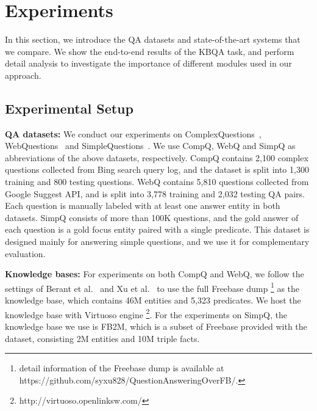 \section{Experiments}
\label{sec:exp}

In this section, we introduce the QA datasets and state-of-the-art systems
that we compare.
We show the end-to-end results of the KBQA task,
and perform detail analysis to investigate the importance of different modules
used in our approach.



\subsection{Experimental Setup}

\textbf{QA datasets:}
We conduct our experiments on ComplexQuestions~\cite{bao2016constraint},
WebQuestions~\cite{berant2013semantic} and SimpleQuestions~\cite{bordes2015large}.
We use CompQ, WebQ and SimpQ as abbreviations of the above datasets, respectively.
CompQ contains 2,100 complex questions collected from Bing search query log,
and the dataset is split into 1,300 training and 800 testing questions.
WebQ contains 5,810 questions collected from Google Suggest API,
and is split into 3,778 training and 2,032 testing QA pairs.
Each question is manually labeled with at least one answer entity in both datasets.
SimpQ consists of more than 100K questions,
and the gold answer of each question is a gold focus entity paired with a single predicate.
This dataset is designed mainly for answering simple questions,
and we use it for complementary evaluation.

\textbf{Knowledge bases:}
For experiments on both CompQ and WebQ,
we follow the settings of Berant et al.~ and
Xu et al.~ to use the full Freebase dump
\footnote{detail information of the Freebase dump is available at
https://github.com/syxu828/QuestionAnsweringOverFB/.}
as the knowledge base, which contains 46M entities and 5,323 predicates.
We host the knowledge base with Virtuoso engine
\footnote{http://virtuoso.openlinksw.com/}.
For the experiments on SimpQ, the knowledge base we use is FB2M,
which is a subset of Freebase provided with the dataset,
consisting 2M entities and 10M triple facts.


